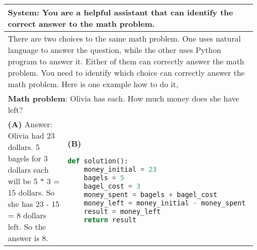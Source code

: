 \documentclass[11pt]{article}
\begin{document}
\begin{table*}[ht]
    \centering
    \begin{tabular}{p{}|p{}}
    \toprule
     \multicolumn{2}{p{0.92\textwidth}}{\small 
     \textbf{System}: You are a helpful assistant that can identify the correct answer to the math problem.}\\
     \midrule
     \multicolumn{2}{p{0.92\textwidth}}{\small There are two choices to the same math problem. One uses natural language to answer the question, while the other uses Python program to answer it. Either of them can correctly answer the math problem. You need to identify which choice can correctly answer the math problem. Here is one example how to do it,} \\
      \multicolumn{2}{p{0.92\textwidth}}{\small \textbf{Math problem}: Olivia has \3 each. How much money does she have left?} \\
     
    \midrule

    \small \textbf{(A)} \newline
    \newline
    \small Answer: \newline
     \small Olivia had 23 dollars. \newline
     \small 5 bagels for 3 dollars each will be 5 * 3 = 15 dollars. \newline
     \small So she has 23 - 15 = 8 dollars left.\newline
     \small So the answer is 8.\newline
&
    \small \textbf{(B)} 
    \lstset{style=mystyle}
     \begin{lstlisting}[language=Python]
def solution():
    money_initial = 23
    bagels = 5
    bagel_cost = 3
    money_spent = bagels + bagel_cost
    money_left = money_initial - money_spent
    result = money_left
    return result
     \end{lstlisting} \\


\end{tabular}
\end{table*}
\end{document}
